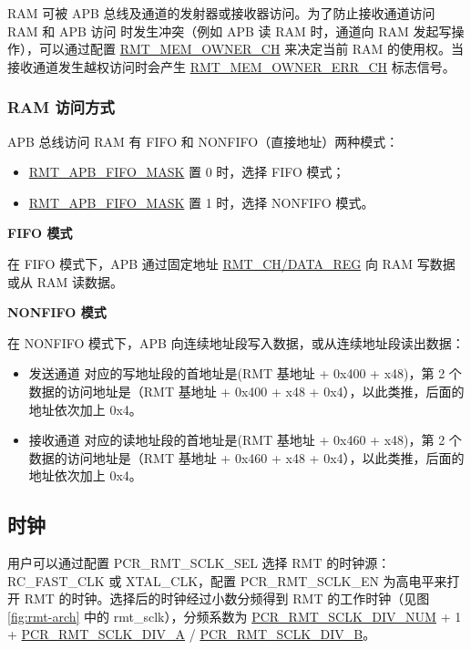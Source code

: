 \documentclass[main\_\_CN.tex]{subfiles}
\begin{document}
RAM 可被 APB 总线及通道的发射器或接收器访问。为了防止接收通道访问 RAM 和 APB 访问 时发生冲突（例如 APB 读 RAM 时，通道向 RAM 发起写操作），可以通过配置 \hyperref[fielddesc:RMTMEMOWNERCHM]{RMT\_MEM\_OWNER\_CH} 来决定当前 RAM 的使用权。当接收通道发生越权访问时会产生 \hyperref[fielddesc:RMTMEMOWNERERRCHM]{RMT\_MEM\_OWNER\_ERR\_CH} 标志信号。 


\subsubsection{RAM 访问方式}

APB 总线访问 RAM 有 FIFO 和 NONFIFO（直接地址）两种模式：

\begin{itemize}
    \item \hyperref[fielddesc:RMTAPBFIFOMASK]{RMT\_APB\_FIFO\_MASK} 置 0 时，选择 FIFO 模式；
    \item \hyperref[fielddesc:RMTAPBFIFOMASK]{RMT\_APB\_FIFO\_MASK} 置 1 时，选择 NONFIFO 模式。
\end{itemize}

\textbf{FIFO 模式}

在 FIFO 模式下，APB 通过固定地址 \hyperref[regdesc:RMTCHNDATAREG]{RMT\_CH/DATA\_REG} 向 RAM 写数据或从 RAM 读数据。

\textbf{NONFIFO 模式}

在 NONFIFO 模式下，APB 向连续地址段写入数据，或从连续地址段读出数据：
\begin{itemize}
    \item 发送通道  对应的写地址段的首地址是(RMT 基地址 + 0x400 + x48)，第 2 个数据的访问地址是（RMT 基地址 + 0x400 + x48 + 0x4），以此类推，后面的地址依次加上 0x4。
    \item 接收通道  对应的读地址段的首地址是(RMT 基地址 + 0x460 + x48)，第 2 个数据的访问地址是（RMT 基地址 + 0x460 + x48 + 0x4），以此类推，后面的地址依次加上 0x4。
\end{itemize}


\subsection{时钟}\label{rmt-clock}

用户可以通过配置 PCR\_RMT\_SCLK\_SEL 选择 RMT 的时钟源：RC\_FAST\_CLK 或 XTAL\_CLK，配置 PCR\_RMT\_SCLK\_EN 为高电平来打开 RMT 的时钟。选择后的时钟经过小数分频得到 RMT 的工作时钟（见图 \ref{fig:rmt-arch} 中的 rmt\_sclk），分频系数为
\hyperref[fielddesc:PCRRMTSCLKDIVNUM]{PCR\_RMT\_SCLK\_DIV\_NUM} + 1 + \hyperref[fielddesc:PCRRMTSCLKDIVA]{PCR\_RMT\_SCLK\_DIV\_A} / \hyperref[fielddesc:PCRRMTSCLKDIVB]{PCR\_RMT\_SCLK\_DIV\_B}。
\end{document}
